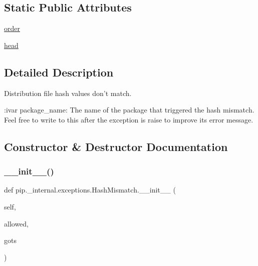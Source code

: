 \subsection*{Static Public Attributes}
\begin{DoxyCompactItemize}
\item 
\hyperlink{classpip_1_1__internal_1_1exceptions_1_1HashMismatch_a4fc4e64996bfc3b6bc04de26fc5fbdad}{order}
\item 
\hyperlink{classpip_1_1__internal_1_1exceptions_1_1HashMismatch_ad30d1a1e5d1ab18cdece99cf47388f04}{head}
\end{DoxyCompactItemize}


\subsection{Detailed Description}
\begin{DoxyVerb}Distribution file hash values don't match.

:ivar package_name: The name of the package that triggered the hash
    mismatch. Feel free to write to this after the exception is raise to
    improve its error message.\end{DoxyVerb}
 

\subsection{Constructor \& Destructor Documentation}
\mbox{\label{classpip_1_1__internal_1_1exceptions_1_1HashMismatch_aab8a4ca77ea02ae1c55ff6b8405ccfa2}} 
\subsubsection{\texorpdfstring{\+\_\+\+\_\+init\+\_\+\+\_\+()}{\_\_init\_\_()}}
{\footnotesize\ttfamily def pip.\+\_\+internal.\+exceptions.\+Hash\+Mismatch.\+\_\+\+\_\+init\+\_\+\+\_\+ (\begin{DoxyParamCaption}\item[{}]{self,  }\item[{}]{allowed,  }\item[{}]{gots }\end{DoxyParamCaption})}

